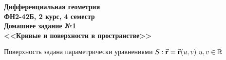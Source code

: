\documentclass{article}
\begin{document}
    \begin{center}
        {\textbf 
            {\Large
                Дифференциальная геометрия
                \\[5mm]
                ФН2-42Б, 2 курс, 4 семестр
                \\[15mm]
                Домашнее задание №1
                \\[5mm]
                <<Кривые и поверхности в пространстве>>
            }
        }
    \end{center}

    Поверхность задана параметрически уравнениями $ S: \vec{\textbf r} = \vec{\textbf r}(u, v) \  u, v \in \mathbb{R}$
    
\end{document}
